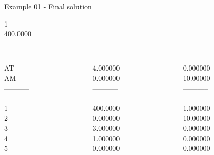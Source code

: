 \begin{frame}{Example 01 - Final solution}

 1\\
  400.0000\\

\begin{columns}[t]
\begin{column}{0.3\textwidth}
\\
AT\\
AM\\
-----------\\
\\
1\\
2\\
3\\
4\\
5\\
\end{column}
\begin{column}{0.3\textwidth}
\\
4.000000\\
0.000000\\
-----------\\
\\
400.0000\\
0.000000\\
3.000000\\
1.000000\\
0.000000\\

\end{column}  

\begin{column}{0.3\textwidth}
\\
0.000000\\
10.00000\\
-----------\\
\\
1.000000\\
10.00000\\
0.000000\\
0.000000\\
0.000000\\
\end{column}  
\end{columns}

\end{frame}
